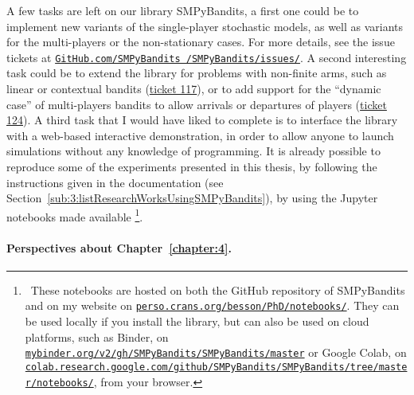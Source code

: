 A few tasks are left on our library SMPyBandits, a first one could be to implement new variants of the single-player stochastic models, as well as variants for the multi-players or the non-stationary cases.
For more details, see the issue tickets at \href{https://github.com/SMPyBandits/SMPyBandits/issues/}{\texttt{GitHub.com/SMPyBandits /SMPyBandits/issues/}}.
%
A second interesting task could be to extend the library for problems with non-finite arms, such as linear or contextual bandits (\href{https://github.com/SMPyBandits/SMPyBandits/issues/117}{ticket 117}),
or to add support for the ``dynamic case'' of multi-players bandits to allow arrivals or departures of players (\href{https://github.com/SMPyBandits/SMPyBandits/issues/124}{ticket 124}).
%
A third task that I would have liked to complete is to interface the library with a web-based interactive demonstration, in order to allow anyone to launch simulations without any knowledge of programming.
It is already possible to reproduce some of the experiments presented in this thesis,
by following the instructions given in the documentation (see Section~\ref{sub:3:listResearchWorksUsingSMPyBandits}),
by using the Jupyter notebooks \cite{jupyter} made available
\footnote{~These notebooks are hosted on both the GitHub repository of SMPyBandits and on my website on \href{https://perso.crans.org/besson/PhD/notebooks/}{\texttt{perso.crans.org/besson/PhD/notebooks/}}. They can be used locally if you install the library, but can also be used on cloud platforms, such as Binder, on \href{https://mybinder.org/v2/gh/SMPyBandits/SMPyBandits/master}{\texttt{mybinder.org/v2/gh/SMPyBandits/SMPyBandits/master}} or Google Colab, on \href{https://colab.research.google.com/github/SMPyBandits/SMPyBandits/tree/master/notebooks/}{\texttt{colab.research.google.com/github/SMPyBandits/SMPyBandits/tree/master/notebooks/}}, from your browser.}.



\paragraph{Perspectives about \textbf{Chapter~\ref{chapter:4}}.}




